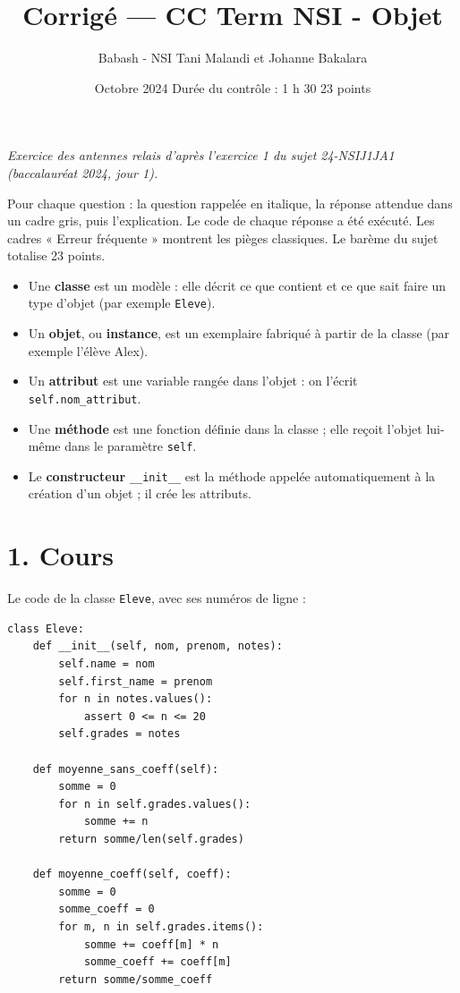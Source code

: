 \documentclass[11pt, a4paper]{exam}
\title{Corrigé --- CC Term NSI - Objet}
\author{Babash - NSI Tani Malandi et Johanne Bakalara}
\date{Octobre 2024 \textperiodcentered{} Durée du contrôle : 1 h 30 \textperiodcentered{} 23 points}
\newcommand{\code}[1]{\texttt{#1}}
\begin{document}
\pagestyle{foot}
\maketitle
\thispagestyle{foot}
\begin{center}\footnotesize\itshape Exercice des antennes relais d'après l'exercice 1 du sujet 24-NSIJ1JA1 (baccalauréat 2024, jour 1).\end{center}

\begin{retenir}
Pour chaque question : la question rappelée en italique, la réponse attendue dans un cadre gris, puis l'explication. Le code de chaque réponse a été exécuté. Les cadres « Erreur fréquente » montrent les pièges classiques. Le barème du sujet totalise 23 points.
\end{retenir}

\begin{retenir}
\begin{itemize}
\item Une \textbf{classe} est un modèle : elle décrit ce que contient et ce que sait faire un type d'objet (par exemple \code{Eleve}).
\item Un \textbf{objet}, ou \textbf{instance}, est un exemplaire fabriqué à partir de la classe (par exemple l'élève Alex).
\item Un \textbf{attribut} est une variable rangée dans l'objet : on l'écrit \code{self.nom\_attribut}.
\item Une \textbf{méthode} est une fonction définie dans la classe ; elle reçoit l'objet lui-même dans le paramètre \code{self}.
\item Le \textbf{constructeur} \code{\_\_init\_\_} est la méthode appelée automatiquement à la création d'un objet ; il crée les attributs.
\end{itemize}
\end{retenir}

\section*{1. Cours}

Le code de la classe \code{Eleve}, avec ses numéros de ligne :
\begin{lstlisting}
class Eleve:
    def __init__(self, nom, prenom, notes):
        self.name = nom
        self.first_name = prenom
        for n in notes.values():
            assert 0 <= n <= 20
        self.grades = notes

    def moyenne_sans_coeff(self):
        somme = 0
        for n in self.grades.values():
            somme += n
        return somme/len(self.grades)

    def moyenne_coeff(self, coeff):
        somme = 0
        somme_coeff = 0
        for m, n in self.grades.items():
            somme += coeff[m] * n
            somme_coeff += coeff[m]
        return somme/somme_coeff
\end{lstlisting}
\end{document}
